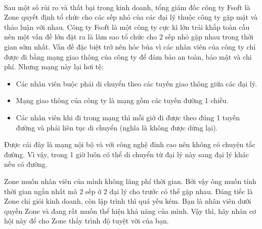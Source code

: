  

Sau một số rủi ro và thất bại trong kinh doanh, tổng giám đốc công ty Fsoft là Zone quyết định tổ chức cho các sếp nhỏ của các đại lý thuộc công ty gặp mặt và thảo luận với nhau. Công ty Fsoft là một công ty cực kì lớn trải khắp toàn cầu nên một vấn đề lớn đặt ra là làm sao tổ chức cho 2 sếp nhỏ gặp nhau trong thời gian sớm nhất. Vấn đề đặc biệt trở nên hóc búa vì các nhân viên của công ty chỉ được đi bằng mạng giao thông của công ty để đảm bảo an toàn, bảo mật và chi phí. Nhưng mạng này lại hơi tệ:
\begin{itemize}
	\item Các nhân viên buộc phải di chuyển theo các tuyến giao thông giữa các đại lý.
	\item Mạng giao thông của công ty là mạng gồm các tuyến đường 1 chiều.
	\item Các nhân viên khi đi trong mạng thì mỗi giờ đi được theo đúng 1 tuyến đường và phải liên tục di chuyển (nghĩa là không được dừng lại).
\end{itemize}

Được cái đây là mạng nội bộ và với công nghệ đỉnh cao nên không có chuyện tắc đường. Vì vậy, trong 1 giờ luôn có thể di chuyển từ đại lý này sang đại lý khác nếu có đường.

Zone muốn nhân viên của mình không lãng phí thời gian. Bởi vậy ông muốn tính thời gian ngắn nhất mà 2 sếp ở 2 đại lý cho trước có thể gặp nhau. Đáng tiếc là Zone chỉ giỏi kinh doanh, còn lập trình thì quá yếu kém. Bạn là nhân viên dưới quyền Zone và đang rất muốn thể hiện khả năng của mình. Vậy thì, hãy nhân cơ hội này để cho Zone thấy trình độ tuyệt vời của bạn.